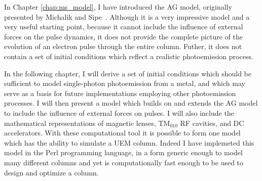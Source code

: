 In Chapter \ref{chap:ms_model}, I have introduced the AG model, originally presented by Michalik and Sipe~\cite{michalik_analytic_2006}.
Although it is a very impressive model and a very useful starting point, because it cannot include the influence of external forces on the pulse dynamics, it does not provide the complete picture of the evolution of an electron pulse through the entire column.
Futher, it does not contain a set of initial conditions which reflect a realistic photoemission process.

In the following chapter, I will derive a set of initial conditions which should be sufficient to model single-photon photoemission from a metal, and which may serve as a basis for future implementations employing other photoemission processes.
I will then present a model which builds on and extends the AG model to include the influence of external forces on pulses.
I will also include the mathematical representations of magnetic lenses, TM$_{010}$ RF cavities, and DC accelerators.
With these computational tool it is possible to form one model which has the ability to simulate a UEM column.
Indeed I have implemeted this model in the Perl programming language, in a form generic enough to model many different columns and yet is computationally fast enough to be used to design and optimize a column.
